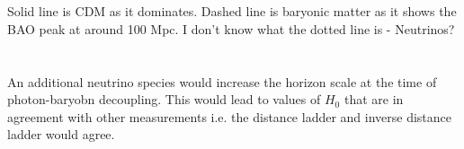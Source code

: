 \documentclass[a4paper,12pt]{article}
\begin{document}
\section{}
Solid line is CDM as it dominates.
\newline
Dashed line is baryonic matter as it shows the BAO peak at around 100 Mpc.
\newline
I don't know what the dotted line is - Neutrinos?
\section{}
An additional neutrino species would increase the horizon scale at the time of photon-baryobn decoupling.
This would lead to values of $H_0$ that are in agreement with other measurements i.e. the distance ladder
and inverse distance ladder would agree.
\end{document}
